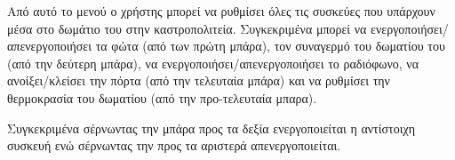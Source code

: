 \documentclass[a4paper,titlepage,twoside,12pt,leqno]{article}
\begin{document}
Από αυτό το μενού ο χρήστης μπορεί να ρυθμίσει όλες τις συσκεύες που υπάρχουν μέσα στο δωμάτιο του στην καστροπολιτεία. Συγκεκριμένα μπορεί να ενεργοποιήσει/απενεργοποιήσει τα φώτα (από των πρώτη μπάρα), τον συναγερμό του δωματίου του (από την δεύτερη μπάρα), να ενεργοποιήσει/απενεργοποιήσει το ραδιόφωνο, να ανοίξει/κλείσει την πόρτα (από την τελευταία μπάρα) και να ρυθμίσει την θερμοκρασία του δωματίου (από την προ-τελευταία μπαρα).

Συγκεκριμένα σέρνωντας την μπάρα προς τα δεξία ενεργοποιείται η αντίστοιχη συσκευή ενώ σέρνωντας την προς τα αριστερά απενεργοποιείται.


\end{document}

